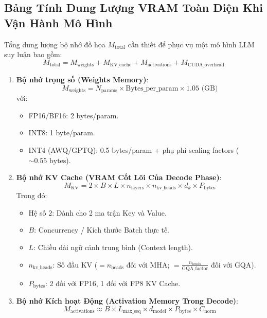 \subsection{Bảng Tính Dung Lượng VRAM Toàn Diện Khi Vận Hành Mô Hình}

Tổng dung lượng bộ nhớ đồ họa $M_{\text{total}}$ cần thiết để phục vụ một mô hình LLM suy luận bao gồm:
\begin{equation}
M_{\text{total}} = M_{\text{weights}} + M_{\text{KV\_cache}} + M_{\text{activations}} + M_{\text{CUDA\_overhead}}
\end{equation}

\begin{enumerate}
  \item \textbf{Bộ nhớ trọng số (Weights Memory)}:
  \begin{equation}
  M_{\text{weights}} = N_{\text{params}} \times \text{Bytes\_per\_param} \times 1.05 \text{ (GB)}
  \end{equation}
  với:
  \begin{itemize}
    \item FP16/BF16: 2 bytes/param.
    \item INT8: 1 byte/param.
    \item INT4 (AWQ/GPTQ): 0.5 bytes/param + phụ phí scaling factors ($\sim 0.55\text{ bytes}$).
  \end{itemize}

  \item \textbf{Bộ nhớ KV Cache (VRAM Cốt Lõi Của Decode Phase)}:
  \begin{equation}
  M_{\text{KV}} = 2 \times B \times L \times n_{\text{layers}} \times n_{\text{kv\_heads}} \times d_k \times P_{\text{bytes}}
  \end{equation}
  Trong đó:
  \begin{itemize}
    \item Hệ số $2$: Dành cho 2 ma trận Key và Value.
    \item $B$: Concurrency / Kích thước Batch thực tế.
    \item $L$: Chiều dài ngữ cảnh trung bình (Context length).
    \item $n_{\text{kv\_heads}}$: Số đầu KV ($= n_{\text{heads}}$ đối với MHA; $= \frac{n_{\text{heads}}}{\text{GQA\_factor}}$ đối với GQA).
    \item $P_{\text{bytes}}$: 2 đối với FP16, 1 đối với FP8 KV Cache.
  \end{itemize}

  \item \textbf{Bộ nhớ Kích hoạt Động (Activation Memory Trong Decode)}:
  \begin{equation}
  M_{\text{activations}} \approx B \times L_{\text{max\_seq}} \times d_{\text{model}} \times P_{\text{bytes}} \times C_{\text{norm}}
  \end{equation}
\end{enumerate}

